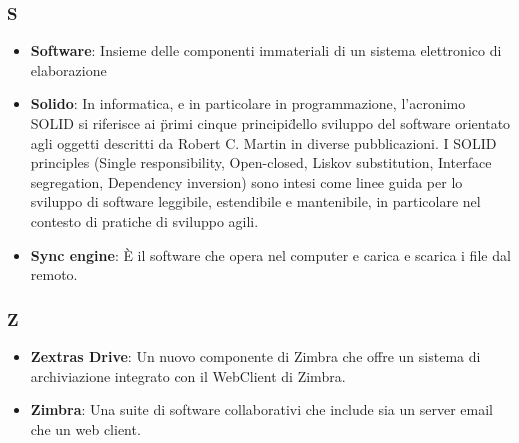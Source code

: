 \subsubsection{S}
\begin{itemize}
	\item \textbf{Software}: Insieme delle componenti immateriali di un sistema elettronico di elaborazione
	\item \textbf{Solido}: In informatica, e in particolare in programmazione, l'acronimo SOLID si riferisce ai \"primi cinque principi\" dello sviluppo del software orientato agli oggetti descritti da Robert C. Martin in diverse pubblicazioni. I SOLID principles (Single responsibility, Open-closed, Liskov substitution, Interface segregation, Dependency inversion) sono intesi come linee guida per lo sviluppo di software leggibile, estendibile e mantenibile, in particolare nel contesto di pratiche di sviluppo agili.
	\item \textbf{Sync engine}: È il software che opera nel computer e carica e scarica i file dal remoto.
\end{itemize}

\subsubsection{Z}
\begin{itemize}
	\item \textbf{Zextras Drive}: Un nuovo componente di Zimbra che offre un sistema di archiviazione integrato con il WebClient di Zimbra. 
	\item \textbf{Zimbra}: Una suite di software collaborativi che include sia un server email che un web client.
\end{itemize}